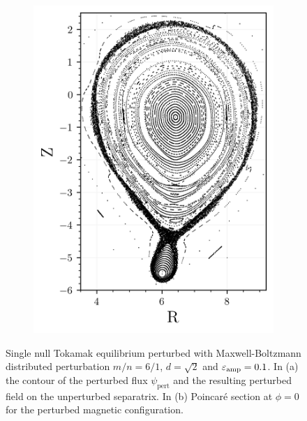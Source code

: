 \begin{figure}
\begin{subfigure}{0.41\textwidth}
        \includegraphics[width=\textwidth]{images/toytok/perturbed-6-1/perturbed_6_1.png}
        \caption{}
        \label{fig:toytok-61-p}
    \end{subfigure}
    \caption{Single null Tokamak equilibrium perturbed with Maxwell-Boltzmann distributed perturbation $m/n = 6/1$, $d = \sqrt{2}$ and $\varepsilon_\text{amp} = 0.1$. In (a) the contour of the perturbed flux $\psi_\text{pert}$ and the resulting perturbed field on the unperturbed separatrix. In (b) Poincaré section at $\phi = 0$ for the perturbed magnetic configuration.}
    \label{fig:toytok-61}
\end{figure}

